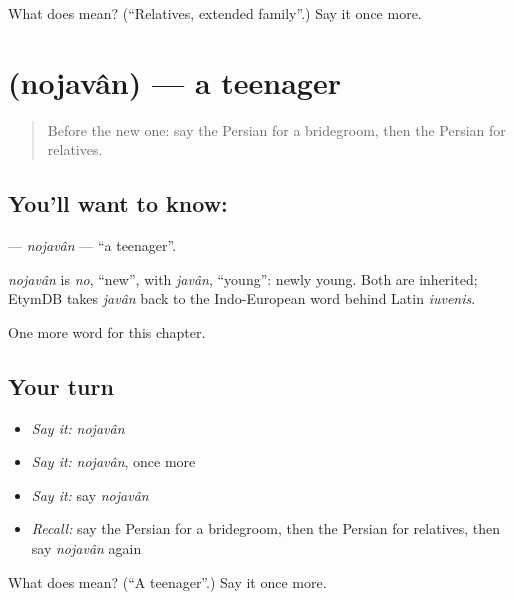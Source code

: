 \begin{tcolorbox}[breakable,colback=teal!4,colframe=teal!35!black,title={Before you move on}]
What does  mean? (\textquotedblleft{}Relatives, extended family\textquotedblright{}.) Say it once more.
\end{tcolorbox}
\section[\texorpdfstring{\fa{نوجوان} (nojavân)}{نوجوان (nojavân)}]{ (nojavân) — a teenager}

\label{lesson:FA-C277-nojavan}



\begin{quote}
Before the new one: say the Persian for a bridegroom, then the Persian for relatives.
\end{quote}

\subsection*{You'll want to know: }
\textbf{} — \emph{nojavân} — \textquotedblleft{}a teenager\textquotedblright{}.

\begin{cousinweb}
\emph{nojavân} is \emph{no}, \textquotedblleft{}new\textquotedblright{}, with \emph{javân}, \textquotedblleft{}young\textquotedblright{}: newly young. Both are inherited; EtymDB takes \emph{javân} back to the Indo-European word behind Latin \emph{iuvenis}.
\end{cousinweb}

\begin{grammarlens}[title={What you've built}]
One more word for this chapter.
\end{grammarlens}

\subsection*{Your turn}
\begin{itemize}
\raggedright
  \item \emph{Say it:} \emph{nojavân}
  \item \emph{Say it:} \emph{nojavân}, once more
  \item \emph{Say it:} say \emph{nojavân}
  \item \emph{Recall:} say the Persian for a bridegroom, then the Persian for relatives, then say \emph{nojavân} again
\end{itemize}

\begin{tcolorbox}[breakable,colback=teal!4,colframe=teal!35!black,title={Before you move on}]
What does  mean? (\textquotedblleft{}A teenager\textquotedblright{}.) Say it once more.
\end{tcolorbox}
